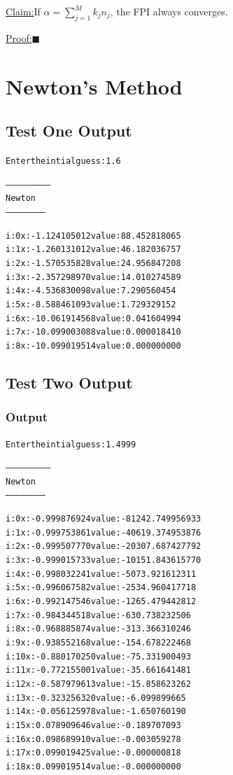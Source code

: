 \documentclass[11pt]{article} %
\newenvironment{claim}[1]{\par\noindent\underline{Claim:}\space#1}{}
\newenvironment{proof}[1]{\par\noindent\underline{Proof:}\space#1}{\hfill $\blacksquare$}
\begin{document}

\begin{claim}
If $\alpha  = \sum_{j=1}^M k_jn_j$, the FPI always converges.
\end{claim}
\begin{proof}
\end{proof}


\section*{Newton's Method}

\subsection*{Test One Output}
\begin{alltt}
Enter the intial guess: 1.6

--------------------------
 Newton
 -----------------------


i: 0	x: -1.124105012	value: 88.452818065
i: 1	x: -1.260131012	value: 46.182036757
i: 2	x: -1.570535828	value: 24.956847208
i: 3	x: -2.357298970	value: 14.010274589
i: 4	x: -4.536830098	value: 7.290560454
i: 5	x: -8.588461093	value: 1.729329152
i: 6	x: -10.061914568	value: 0.041604994
i: 7	x: -10.099003088	value: 0.000018410
i: 8	x: -10.099019514	value: 0.000000000

\end{alltt}

\subsection*{Test Two Output}
\subsubsection*{Output}
\begin{alltt}
Enter the intial guess: 1.4999

--------------------------
 Newton
 -----------------------


i: 0	x: -0.999876924	value: -81242.749956933
i: 1	x: -0.999753861	value: -40619.374953876
i: 2	x: -0.999507770	value: -20307.687427792
i: 3	x: -0.999015733	value: -10151.843615770
i: 4	x: -0.998032241	value: -5073.921612311
i: 5	x: -0.996067582	value: -2534.960417718
i: 6	x: -0.992147546	value: -1265.479442812
i: 7	x: -0.984344518	value: -630.738232506
i: 8	x: -0.968885874	value: -313.366310246
i: 9	x: -0.938552168	value: -154.678222468
i: 10	x: -0.880170250	value: -75.331900493
i: 11	x: -0.772155001	value: -35.661641481
i: 12	x: -0.587979613	value: -15.858623262
i: 13	x: -0.323256320	value: -6.099899665
i: 14	x: -0.056125978	value: -1.650760190
i: 15	x: 0.078909646	value: -0.189707093
i: 16	x: 0.098689910	value: -0.003059278
i: 17	x: 0.099019425	value: -0.000000818
i: 18	x: 0.099019514	value: -0.000000000

\end{alltt}
\end{document}
